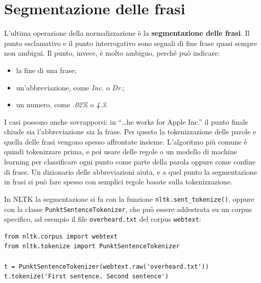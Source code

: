 \section{Segmentazione delle frasi}
L'ultima operazione della normalizzazione è la \textbf{segmentazione delle frasi}. Il punto esclamativo e il punto interrogativo sono segnali di fine frase quasi sempre non ambigui. Il punto, invece, è molto ambiguo, perché può indicare:
\begin{itemize}
    \item la fine di una frase;
    \item un'abbreviazione, come \textit{Inc.} o \textit{Dr.};
    \item un numero, come \textit{.02\%} o \textit{4.3}.
\end{itemize}
I casi possono anche sovrapporsi: in \enquote{\dots he works for Apple Inc.} il punto finale chiude sia l'abbreviazione sia la frase. Per questo la tokenizzazione delle parole e quella delle frasi vengono spesso affrontate insieme. L'algoritmo più comune è quindi tokenizzare prima, e poi usare delle regole o un modello di machine learning per classificare ogni punto come parte della parola oppure come confine di frase. Un dizionario delle abbreviazioni aiuta, e a quel punto la segmentazione in frasi si può fare spesso con semplici regole basate sulla tokenizzazione.

In NLTK la segmentazione si fa con la funzione \texttt{nltk.sent\_tokenize()}, oppure con la classe \texttt{PunktSentenceTokenizer}, che può essere addestrata su un corpus specifico, ad esempio il file \texttt{overheard.txt} del corpus \texttt{webtext}:
\begin{lstlisting}[style=py]
from nltk.corpus import webtext
from nltk.tokenize import PunktSentenceTokenizer

t = PunktSentenceTokenizer(webtext.raw('overheard.txt'))
t.tokenize('First sentence. Second sentence')
\end{lstlisting}

